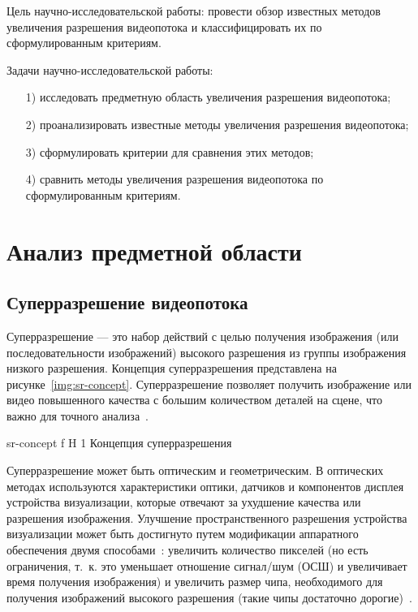 \documentclass{bmstu}
\begin{document}
Цель научно-исследовательской работы: провести обзор известных методов увеличения разрешения видеопотока и классифицировать их по сформулированным критериям.

Задачи научно-исследовательской работы:
\begin{enumerate}
\item[1)] исследовать предметную область увеличения разрешения видеопотока;
\item[2)] проанализировать известные методы увеличения разрешения видеопотока;
\item[3)] сформулировать критерии для сравнения этих методов;
\item[4)] сравнить методы увеличения разрешения видеопотока по сформулированным критериям.
\end{enumerate}

\chapter{Анализ предметной области}

\section{Суперразрешение видеопотока}

Суперразрешение --- это набор действий с целью получения изображения (или последовательности изображений) высокого разрешения из группы изображения низкого разрешения. 
Концепция суперразрешения представлена на рисунке~\ref{img:sr-concept}. 
Суперразрешение позволяет получить изображение или видео повышенного качества с большим количеством деталей на сцене, что важно для точного анализа~\cite{Daithankar2021}. 

    {sr-concept}
    {f}
    {H}
    {1\textwidth}
    {Концепция суперразрешения~\cite{Daithankar2021}}

Суперразрешение может быть оптическим и геометрическим. 
В оптических методах используются характеристики оптики, датчиков и компонентов дисплея устройства визуализации, которые отвечают за ухудшение качества или разрешения изображения. 
Улучшение пространственного разрешения устройства визуализации может быть достигнуто путем модификации аппаратного обеспечения двумя способами~\cite{Daithankar2021}: увеличить количество пикселей (но есть ограничения, т.~к. это уменьшает отношение сигнал/шум (ОСШ) и увеличивает время получения изображения) и увеличить размер чипа, необходимого для получения изображений высокого разрешения (такие чипы достаточно дорогие)~\cite{Park2003}.
\end{document}
